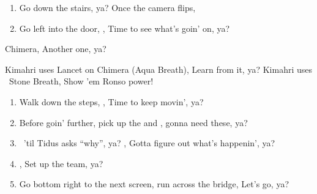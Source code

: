 \begin{enumerate}[resume]
    \item Go down the stairs, ya? Once the camera flips, \formation{\tidus}{\lulu}{\auron}
    \item Go left into the door, \cs[0:50], Time to see what's goin' on, ya?
\end{enumerate}
\begin{battle}{Chimera, Another one, ya?}
    \begin{itemize}
        \kimahrif Kimahri uses Lancet on Chimera (Aqua Breath), Learn from it, ya?
        \kimahrif Kimahri uses \od\ Stone Breath, Show 'em Ronso power!
    \end{itemize}
\end{battle}
\begin{enumerate}[resume]
    \item Walk down the steps, \cs[1:30], Time to keep movin', ya?
    \item Before goin' further, pick up the  and , gonna need these, ya?
    \item \sd\ 'til Tidus asks ``why'', ya? \cs[6:20], Gotta figure out what's happenin', ya?
    \item \formation{\tidus}{\rikku}{\kimahri}, Set up the team, ya?
    \item Go bottom right to the next screen, run across the bridge, Let's go, ya?
\end{enumerate}
\winnp